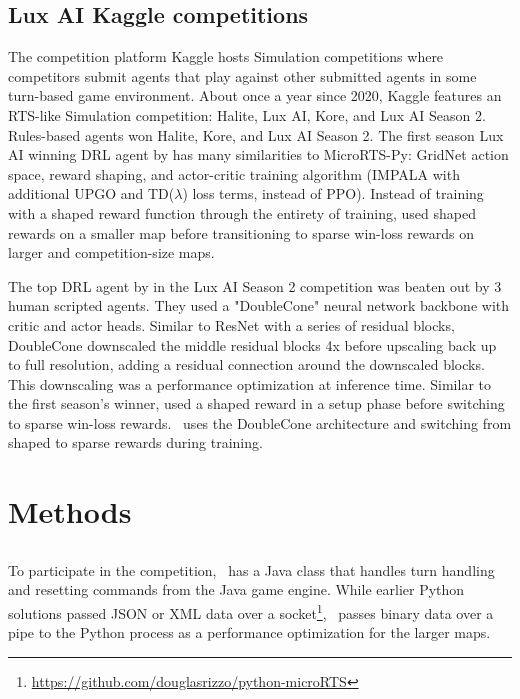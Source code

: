 \documentclass{article}
\begin{document}
\subsection{Lux AI Kaggle competitions}
The competition platform Kaggle hosts Simulation competitions where competitors
submit agents that play against other submitted agents in some turn-based game
environment. About once a year since 2020, Kaggle features an RTS-like Simulation competition:
Halite, Lux AI, Kore, and Lux AI Season 2. Rules-based agents won Halite, Kore, and Lux
AI Season 2. The first season Lux AI winning DRL agent by \citet{lux-ai-2021-winner} 
has many similarities to MicroRTS-Py: GridNet action space, reward shaping, and
actor-critic training algorithm (IMPALA with additional UPGO and TD($\lambda$) loss
terms, instead of PPO). Instead
of training with a shaped reward function through the entirety of training, \citet{lux-ai-2021-winner}
used shaped rewards on a smaller map before transitioning to sparse win-loss rewards on
larger and competition-size maps.

The top DRL agent by \citet{Ferdinand2021doublecone} in the Lux AI Season 2 competition was beaten out by 3
human scripted agents. They used a "DoubleCone" neural
network backbone with critic and actor heads. Similar to ResNet with a series of
residual blocks, DoubleCone downscaled the middle residual blocks 4x
before upscaling back up to full resolution, adding a residual connection around the
downscaled blocks. This downscaling was a performance optimization at
inference time. Similar to the first season's winner, \citet{Ferdinand2021doublecone}
used a shaped reward in a setup phase before switching to sparse win-loss rewards. 
\agentName\ uses the DoubleCone architecture and switching from shaped to sparse rewards
during training.

\section{Methods}
\subsection{\agentName}
To participate in the competition, \agentName\ has a Java class that handles turn
handling and resetting commands from the Java game engine. While earlier Python
solutions  passed JSON or XML data over a socket\footnote{\url{https://github.com/douglasrizzo/python-microRTS}}, \agentName\ passes
binary data over a pipe to the Python process as a performance optimization for the
larger maps.
\end{document}
